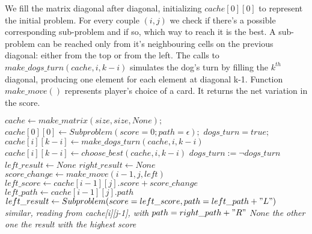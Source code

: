 \documentclass{article}
\begin{document}
We fill the matrix diagonal after diagonal, initializing $cache[0][0]$ to represent the initial problem. For every couple $(i,j)$ we check if there's a possible corresponding sub-problem and if so, which way to reach it is the best. A sub-problem can be reached only from it's neighbouring cells on the previous diagonal: either from the top or from the left. The calls to $ make\_dogs\_turn(cache, i, k-i)$ simulates the dog's turn by filling the $k^{th}$ diagonal, producing one element for each element at diagonal k-1. Function $make\_move()$ represents player's choice of a card. It returns the net variation in the score.
\begin{algorithm}[H]
\begin{algorithmic}
\caption{}
\State $cache \leftarrow make\_matrix(size, size, None);$
\State $cache[0][0] \leftarrow Subproblem(score=0; path=\epsilon);$
\State $dogs\_turn = true;$
            \State $cache[i][k-i] \leftarrow make\_dogs\_turn(cache, i, k-i)$
        \EndFor
    \Else 
            \State $cache[i][k-i] \leftarrow choose\_best(cache, i, k-i)$
        \EndFor
    \EndIf
    \State $dogs\_turn := \neg dogs\_turn$
\EndFor
\EndProcedure
\State \\
\State $left\_result \leftarrow None$
\State $right\_result \leftarrow None$
    \State $score\_change \leftarrow make\_move(i-1, j, left)$
    \State $left\_score \leftarrow cache[i-1][j].score + score\_change$
    \State $left\_path \leftarrow cache[i-1][j].path$
    \State $left\_result \leftarrow Subproblem(score=left\_score, path=left\_path + "L")$
\EndIf
{}
    \State \textit{similar, reading from cache[i][j-1], with}
    \State $path=right\_path + "R"$
\EndIf
    \State \Return $None$
    \State \Return \textit{the other one}
\Else
    \State \Return \textit{the result with the highest score}
\EndIf
\EndProcedure


\end{algorithmic}
\end{algorithm}
\end{document}
